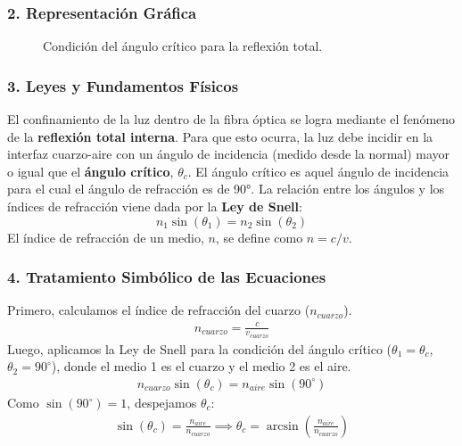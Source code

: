 \subsubsection*{2. Representación Gráfica}
\begin{figure}[H]
    \centering
    \caption{Condición del ángulo crítico para la reflexión total.}
\end{figure}

\subsubsection*{3. Leyes y Fundamentos Físicos}
El confinamiento de la luz dentro de la fibra óptica se logra mediante el fenómeno de la \textbf{reflexión total interna}. Para que esto ocurra, la luz debe incidir en la interfaz cuarzo-aire con un ángulo de incidencia (medido desde la normal) mayor o igual que el \textbf{ángulo crítico}, $\theta_c$.
El ángulo crítico es aquel ángulo de incidencia para el cual el ángulo de refracción es de 90°. La relación entre los ángulos y los índices de refracción viene dada por la \textbf{Ley de Snell}:
$$ n_1 \sin(\theta_1) = n_2 \sin(\theta_2) $$
El índice de refracción de un medio, $n$, se define como $n = c/v$.

\subsubsection*{4. Tratamiento Simbólico de las Ecuaciones}
Primero, calculamos el índice de refracción del cuarzo ($n_{cuarzo}$).
\begin{gather}
    n_{cuarzo} = \frac{c}{v_{cuarzo}}
\end{gather}
Luego, aplicamos la Ley de Snell para la condición del ángulo crítico ($\theta_1 = \theta_c$, $\theta_2 = 90^\circ$), donde el medio 1 es el cuarzo y el medio 2 es el aire.
\begin{gather}
    n_{cuarzo} \sin(\theta_c) = n_{aire} \sin(90^\circ)
\end{gather}
Como $\sin(90^\circ) = 1$, despejamos $\theta_c$:
\begin{gather}
    \sin(\theta_c) = \frac{n_{aire}}{n_{cuarzo}} \implies \theta_c = \arcsin\left(\frac{n_{aire}}{n_{cuarzo}}\right)
\end{gather}

